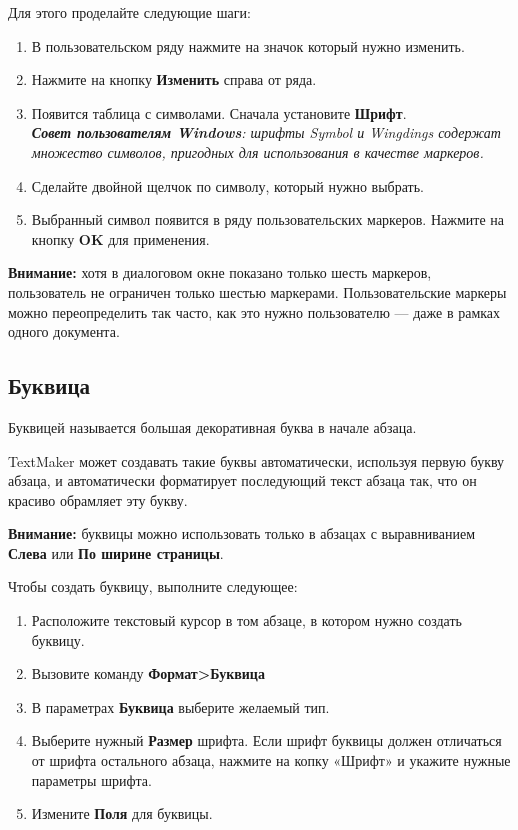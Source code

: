 ﻿\documentclass[a4paper,10pt]{article}
\begin{document}
Для этого проделайте следующие шаги:
\begin{enumerate}
 \item В пользовательском ряду нажмите на значок который нужно изменить.
 \item Нажмите на кнопку \textbf{Изменить} справа от ряда.
 \item Появится таблица с символами. Сначала установите \textbf{Шрифт}.\\
 {\footnotesize \textit{\textbf{Совет пользователям Windows}: шрифты Symbol и Wingdings содержат множество символов, пригодных для использования в качестве маркеров.}}
 \item Сделайте двойной щелчок по символу, который нужно выбрать.
 \item Выбранный символ появится в ряду пользовательских маркеров. Нажмите на кнопку \textbf{OK} для применения.
\end{enumerate}
\pagebreak
\begin{mdframed}[backgroundcolor=blue!10]
\textbf{Внимание:} хотя в диалоговом окне показано только шесть маркеров, пользователь не ограничен только шестью маркерами. Пользовательские маркеры можно переопределить так часто, как это нужно пользователю — даже в рамках одного документа.
\end{mdframed}

\subsection{Буквица}
Буквицей называется большая декоративная буква в начале абзаца.

TextMaker может создавать такие буквы автоматически, используя первую букву абзаца, и автоматически форматирует последующий текст абзаца так, что он красиво обрамляет эту букву.
\begin{mdframed}[backgroundcolor=blue!10]
\textbf{Внимание:} буквицы можно использовать только в абзацах с выравниванием \textbf{Слева} или \textbf{По ширине страницы}.
\end{mdframed}

Чтобы создать буквицу, выполните следующее:
\begin{enumerate}
 \item Расположите текстовый курсор в том абзаце, в котором нужно создать буквицу.
 \item Вызовите команду \textbf{Формат>Буквица}
 \item В параметрах \textbf{Буквица} выберите желаемый тип.
 \item Выберите нужный \textbf{Размер} шрифта. Если шрифт буквицы должен отличаться от шрифта остального абзаца, нажмите на копку «Шрифт» и укажите нужные параметры шрифта.
 \item Измените \textbf{Поля} для буквицы.
\end{enumerate}
\end{document}
